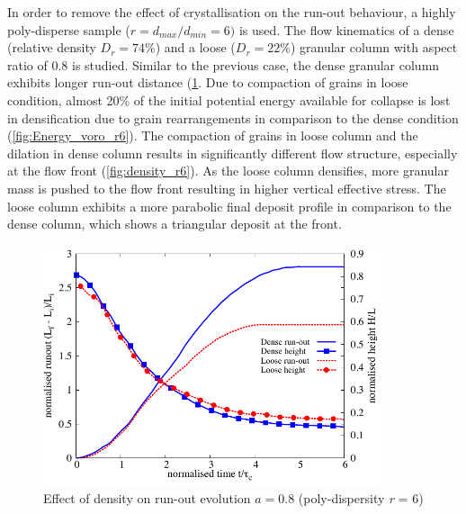 In order to remove the effect of crystallisation on the run-out behaviour, a 
highly poly-disperse sample ($r = d_{max}/d_{min} = 6)$ is used. 
The flow kinematics of a dense (relative density $D_r = 74\%$) and a loose 
($D_r = 22\%$) granular column with aspect ratio of 0.8 is studied. Similar to 
the previous case, the dense granular column exhibits longer run-out distance 
(\cref{fig:runout_height_dense_r6}. Due to compaction of grains in loose 
condition, almost 20\% of the initial potential energy available for collapse 
is lost in densification due to grain rearrangements in comparison to the dense 
condition (\cref{fig:Energy_voro_r6}). The compaction of grains in loose 
column and the dilation in dense column results in significantly different flow 
structure, especially at the flow front (\cref{fig:density_r6}). As the loose 
column densifies, more granular mass is pushed to the flow front resulting in 
higher vertical effective stress. The loose column exhibits a more parabolic 
final deposit profile in comparison to the dense column, which shows a 
triangular deposit at the front.

\begin{figure}[tbhp]
\centering
\includegraphics[width=0.9\textwidth]{runout_height_dense_r6}
\caption{Effect of density on run-out evolution $a = 0.8$ (poly-dispersity 
\textit{r} = 6)}
\label{fig:runout_height_dense_r6}
\end{figure}


